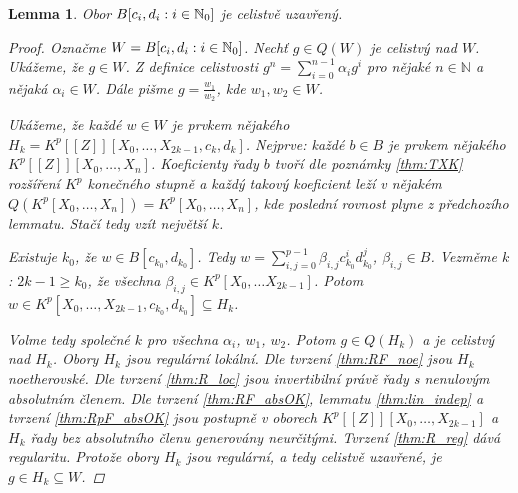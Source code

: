 \documentclass[11pt,a4paper]{article}
\newcommand\m[1]{\mathbb { #1 }} %
\newcommand\N{\m N}
\newcounter{numb}
\theoremstyle{definition}
\theoremstyle{plain}
\newtheorem{lemma}[numb]{Lemma}
\begin{document}
\begin{lemma} \label{thm:Bcdall_icl}
	Obor $\Bcdall$ je celistvě uzavřený.
	
	\begin{proof}
		\newcommand*{\I}{_{i = 0}^{n - 1}}
		
		Označme $W = \Bcdall$. Nechť $g \in Q(W)$ je celistvý nad $W$. Ukážeme, že $g \in W$. Z definice celistvosti $g^n = \sum\I \alpha_i g^i$ pro nějaké $n \in \N$ a nějaká $\alpha_i \in W$. Dále pišme $g = \frac{w_1}{w_2}$, kde $w_1, w_2 \in W$.
		
		Ukážeme, že každé $w \in W$ je prvkem nějakého $H_k = K^p[[Z]][X_0, \hdots, X_{2k - 1}, c_k, d_k]$. Nejprve: každé $b \in B$ je prvkem nějakého $K^p[[Z]][X_0, \hdots, X_n]$. Koeficienty řady $b$ tvoří dle poznámky \ref{thm:TXK} rozšíření $K^p$ konečného stupně a každý takový koeficient leží v nějakém $Q(K^p[X_0, \hdots, X_n]) = K^p[X_0, \hdots, X_n]$, kde poslední rovnost plyne z předchozího lemmatu. Stačí tedy vzít největší $k$.
		
		Existuje $k_0$, že $w \in B[c_{k_0}, d_{k_0}]$. Tedy $w = \sum_{i, j = 0}^{p - 1} \beta_{i, j} c_{k_0}^i d_{k_0}^j$, $\beta_{i, j} \in B$. Vezměme $k$: $2k - 1 \geq k_0$, že všechna $\beta_{i, j} \in K^p[X_0, \hdots X_{2k - 1}]$. Potom $w \in K^p[X_0, \hdots, X_{2k - 1}, c_{k_0}, d_{k_0}] \subseteq H_k$.
		
		Volme tedy společné $k$ pro všechna $\alpha_i$, $w_1$, $w_2$. Potom $g \in Q(H_k)$ a je celistvý nad $H_k$. Obory $H_k$ jsou regulární lokální. Dle tvrzení \ref{thm:RF_noe} jsou $H_k$ noetherovské. Dle tvrzení \ref{thm:R_loc} jsou invertibilní právě řady s nenulovým absolutním členem. Dle tvrzení \ref{thm:RF_absOK}, lemmatu \ref{thm:lin_indep} a tvrzení \ref{thm:RpF_absOK} jsou postupně v oborech $K^p[[Z]][X_0, \hdots, X_{2k - 1}]$ a $H_k$ řady bez absolutního členu generovány neurčitými. Tvrzení \ref{thm:R_reg} dává regularitu. Protože obory $H_k$ jsou regulární, a tedy celistvě uzavřené, je $g \in H_k \subseteq W$.
	\end{proof}
\end{lemma}
\end{document}
